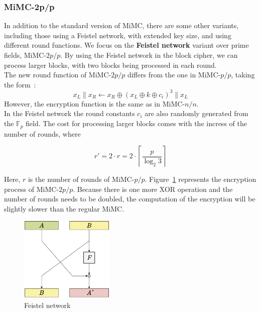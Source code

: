 \subsubsection*{MiMC-2p/p}
In addition to the standard version of MiMC, there are some other variants, including those using a Feistel network, with extended key size, and using different round functions.
We focus on the \textbf{Feistel network} variant over prime fields, MiMC-$2p/p$. By using the Feistel network in the block cipher, we can process larger blocks, with two blocks being processed in each round.\\ 
The new round function of MiMC-$2p/p$ differs from the one in MiMC-$p/p$, taking the form~\cite{albrecht2016mimc}:
\begin{equation}
    x_L\|x_R \longleftarrow x_R \oplus \left(x_L \oplus k \oplus c_i\right)^3\|x_L
\end{equation}
However, the encryption function is the same as in MiMC-$n/n$.\\
In the Feistel network the round constants $c_i$ are also randomly generated from the $\mathbb{F}_{p}$ field. The cost for processing larger blocks comes with the incress of the number of rounds, where

\begin{equation}
    r' = 2 \cdot r = 2 \cdot \left\lceil\frac{p}{\log_2 3}\right\rceil
\end{equation}

Here, $r$ is the number of rounds of MiMC-$p/p$. Figure~\ref{fig:feistel-network} represents the encryption process of MiMC-$2p/p$. Because there is one more XOR operation and the number of rounds needs to be doubled, the computation of the encryption will be slightly slower than the regular MiMC.

\begin{figure}[htbp]
    \centering
    \includegraphics[width=0.4\textwidth]{graphics/feistel.jpg}
    \caption{Feistel network}
    \label{fig:feistel-network}
\end{figure}

